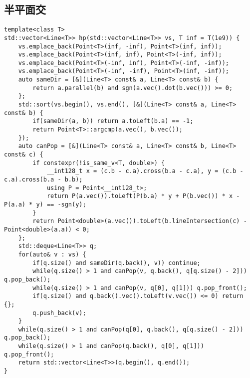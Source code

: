 \subsection{半平面交}
\begin{lstlisting}
template<class T>
std::vector<Line<T>> hp(std::vector<Line<T>> vs, T inf = T(1e9)) {
    vs.emplace_back(Point<T>(inf, -inf), Point<T>(inf, inf));
    vs.emplace_back(Point<T>(inf, inf), Point<T>(-inf, inf));
    vs.emplace_back(Point<T>(-inf, inf), Point<T>(-inf, -inf));
    vs.emplace_back(Point<T>(-inf, -inf), Point<T>(inf, -inf));
    auto sameDir = [&](Line<T> const& a, Line<T> const& b) {
        return a.parallel(b) and sgn(a.vec().dot(b.vec())) >= 0;
    };
    std::sort(vs.begin(), vs.end(), [&](Line<T> const& a, Line<T> const& b) {
        if(sameDir(a, b)) return a.toLeft(b.a) == -1;
        return Point<T>::argcmp(a.vec(), b.vec());
    });
    auto canPop = [&](Line<T> const& a, Line<T> const& b, Line<T> const& c) {
        if constexpr(!is_same_v<T, double>) {
            __int128_t x = (c.b - c.a).cross(b.a - c.a), y = (c.b - c.a).cross(b.a - b.b);
            using P = Point<__int128_t>;
            return P(a.vec()).toLeft(P(b.a) * y + P(b.vec()) * x - P(a.a) * y) == -sgn(y);
        }
        return Point<double>(a.vec()).toLeft(b.lineIntersection(c) - Point<double>(a.a)) < 0;
    };
    std::deque<Line<T>> q;
    for(auto& v : vs) {
        if(q.size() and sameDir(q.back(), v)) continue;
        while(q.size() > 1 and canPop(v, q.back(), q[q.size() - 2])) q.pop_back();
        while(q.size() > 1 and canPop(v, q[0], q[1])) q.pop_front();
        if(q.size() and q.back().vec().toLeft(v.vec()) <= 0) return {};
        q.push_back(v);
    }
    while(q.size() > 1 and canPop(q[0], q.back(), q[q.size() - 2])) q.pop_back();
    while(q.size() > 1 and canPop(q.back(), q[0], q[1])) q.pop_front();
    return std::vector<Line<T>>(q.begin(), q.end());
}
\end{lstlisting}
